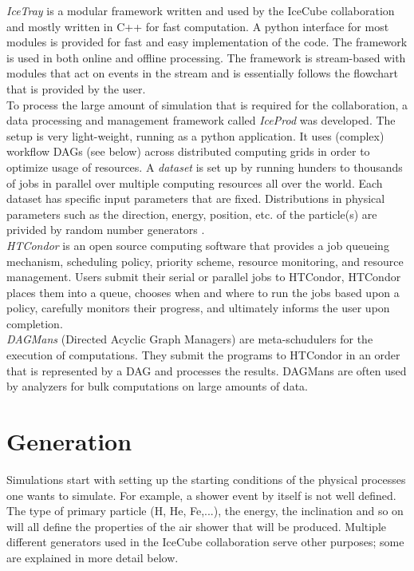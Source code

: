 \begin{corollary}
\textit{IceTray}  is a modular framework written and used by the IceCube collaboration and mostly written in C++ for fast computation. A python interface for most modules is provided for fast and easy implementation of the code. The framework is used in both online and offline processing. The framework is stream-based with modules that act on events in the stream and is essentially follows the flowchart that is provided by the user.\\

\noindent To process the large amount of simulation that is required for the collaboration, a data processing and management framework called \textit{IceProd} was developed. The setup is very light-weight, running as a python application. It uses (complex) workflow DAGs (see below) across distributed computing grids in order to optimize usage of resources. A \textit{dataset} is set up by running hunders to thousands of jobs in parallel over multiple computing resources all over the world. Each dataset has specific input parameters that are fixed. Distributions in physical parameters such as the direction, energy, position, etc. of the particle(s) are privided by random number generators \cite{1742-6596-664-6-062056}.\\

\noindent \textit{HTCondor} is an open source computing software that provides a job queueing mechanism, scheduling policy, priority scheme, resource monitoring, and resource management. Users submit their serial or parallel jobs to HTCondor, HTCondor places them into a queue, chooses when and where to run the jobs based upon a policy, carefully monitors their progress, and ultimately informs the user upon completion.\\

\noindent \textit{DAGMans} (Directed Acyclic Graph Managers) are meta-schudulers for the execution of computations. They submit the programs to HTCondor in an order that is represented by a DAG and processes the results. DAGMans are often used by analyzers for bulk computations on large amounts of data.
\end{corollary}

\section{Generation}
Simulations start with setting up the starting conditions of the physical processes one wants to simulate. For example, a shower event by itself is not well defined. The type of primary particle (H, He, Fe,...), the energy, the inclination and so on will all define the properties of the air shower that will be produced. Multiple different generators used in the IceCube collaboration serve other purposes; some are explained in more detail below.

